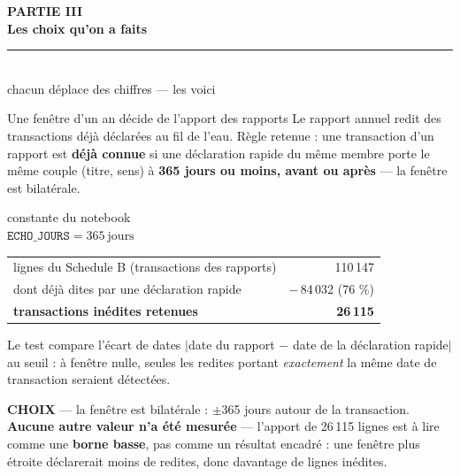 \documentclass[11pt,aspectratio=169]{beamer}
\newcommand{\co}[1]{\texttt{#1}}
\newcommand{\defl}[1]{{\scriptsize\color{black!55}#1}}
\newcommand{\choixbox}[1]{%
  \colorbox{alertred!8}{\parbox{\dimexpr\linewidth-8pt}{\scriptsize
    \textbf{\textcolor{alertred}{CHOIX}}\; --- #1}}}
\newcommand{\bmaths}[2]{%
  {\scriptsize\color{black!55}#1}\\[0.2mm]
  {\small$\displaystyle #2$}\\[2mm]}
\newcommand{\chapdivider}[3]{%
  \begin{frame}[plain]
    \centering\vfill
    {\color{helec!85}\large\textbf{#1}}\\[3.5mm]
    {\color{black!88}\fontsize{29}{33}\selectfont\textbf{#2}}\\[4mm]
    {\color{helec!45}\rule{0.30\textwidth}{1.2pt}}\\[4mm]
    {\color{black!55}\large #3}
    \vfill
  \end{frame}}
\begin{document}
\chapdivider{PARTIE III}{Les choix qu'on a faits}{chacun déplace des chiffres --- les voici}

\begin{frame}{Une fenêtre d'un an décide de l'apport des rapports}
  \vspace{0pt}
  {\footnotesize Le rapport annuel redit des transactions déjà déclarées au fil de l'eau.
   Règle retenue : une transaction d'un rapport est \textbf{déjà connue} si une déclaration
   rapide du même membre porte le même couple (titre, sens) à \textbf{365 jours ou moins,
   avant ou après} --- la fenêtre est bilatérale.}\par\vspace{1.5mm}
  \begin{center}\bmaths{constante du notebook}{\co{ECHO\_JOURS} = 365~\text{jours}}\end{center}
  \vspace{-3mm}
  \begin{center}{\footnotesize
  \begin{tabular}{lr}
    \toprule
    lignes du Schedule B (transactions des rapports) & 110\,147\\
    dont déjà dites par une déclaration rapide & $-$\,84\,032 \defl{(76 \%)}\\
    \midrule
    \textbf{transactions inédites retenues} & \textbf{26\,115}\\
    \bottomrule
  \end{tabular}}\end{center}
  \vspace{1mm}
  {\scriptsize Le test compare l'écart de dates $|$date du rapport $-$ date de la déclaration
   rapide$|$ au seuil : à fenêtre nulle, seules les redites portant \emph{exactement} la même
   date de transaction seraient détectées.}\par\vspace{1.5mm}
  \choixbox{la fenêtre est bilatérale : $\pm$365 jours autour de la transaction.
  \textbf{Aucune autre valeur n'a été mesurée} --- l'apport de 26\,115 lignes est à lire
  comme une \textbf{borne basse}, pas comme un résultat encadré : une fenêtre plus étroite
  déclarerait moins de redites, donc davantage de lignes inédites.}
\end{frame}
\end{document}
